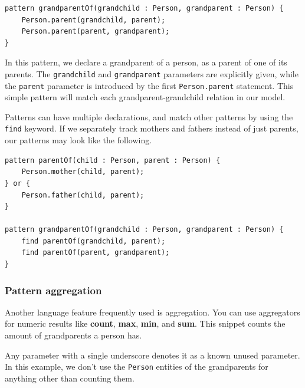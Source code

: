 \documentclass[11pt,a4paper,oneside]{report}
\begin{document}
\begin{lstlisting}[frame=single]
pattern grandparentOf(grandchild : Person, grandparent : Person) {
    Person.parent(grandchild, parent);
    Person.parent(parent, grandparent);
}
\end{lstlisting}

In this pattern, we declare a grandparent of a person, as a parent of one of its
parents. The \texttt{grandchild} and \texttt{grandparent} parameters are
explicitly given, while the \texttt{parent} parameter is introduced by the first
\texttt{Person.parent} statement. This simple pattern will match each
grandparent-grandchild relation in our model.


Patterns can have multiple declarations, and match other patterns by using the
\texttt{find} keyword. If we separately track mothers and fathers instead of
just parents, our patterns may look like the following.

\begin{lstlisting}[frame=single]
pattern parentOf(child : Person, parent : Person) {
    Person.mother(child, parent);
} or {
    Person.father(child, parent);
}

pattern grandparentOf(grandchild : Person, grandparent : Person) {
    find parentOf(grandchild, parent);
    find parentOf(parent, grandparent);
}
\end{lstlisting}

\pagebreak

\subsubsection{Pattern aggregation}
Another language feature frequently used is aggregation. You can use
aggregators for numeric results like \textbf{count}, \textbf{max}, \textbf{min},
and \textbf{sum}. This snippet counts the amount of grandparents a person has.

Any parameter with a single underscore denotes it as a known unused parameter.
In this example, we don't use the \texttt{Person} entities of the grandparents
for anything other than counting them.
\end{document}
